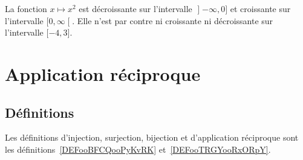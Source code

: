 \begin{example}
    La fonction \( x\mapsto x^2\) est décroissante sur l'intervalle \( \mathopen] -\infty , 0 \mathclose]\) et croissante sur l'intervalle \( \mathopen[ 0 , \infty \mathclose[\). Elle n'est par contre ni croissante ni décroissante sur l'intervalle \( \mathopen[ -4 , 3 \mathclose]\).
\end{example}

\section{Application réciproque}

\subsection{Définitions}

Les définitions d'injection, surjection, bijection et d'application réciproque sont les définitions~\ref{DEFooBFCQooPyKvRK} et~\ref{DEFooTRGYooRxORpY}.

